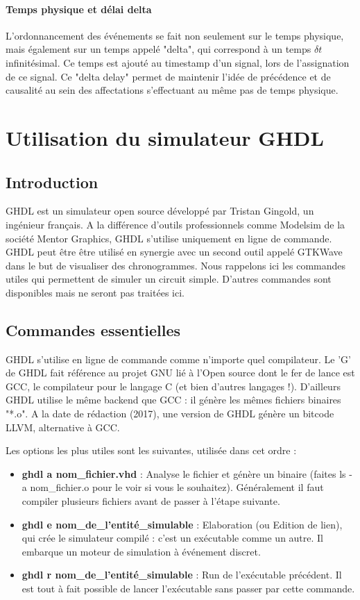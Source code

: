 \paragraph{Temps physique et délai delta}
L'ordonnancement des événements se fait non seulement sur le temps physique, mais également sur un temps appelé "delta", qui correspond
à un temps $\delta t$ infinitésimal. Ce temps est ajouté au timestamp d'un signal, lors de l'assignation de ce signal. Ce "delta delay"
permet de maintenir l'idée de précédence et de causalité au sein des affectations s'effectuant au même pas de temps physique.

\section{Utilisation du simulateur GHDL}


\subsection{Introduction}
GHDL est un simulateur open source développé par Tristan Gingold, un ingénieur français.
A la différence d'outils professionnels comme Modelsim de la société Mentor Graphics, GHDL s'utilise
uniquement en ligne de commande. GHDL peut être être utilisé en synergie avec un second outil appelé GTKWave dans le but de visualiser des chronogrammes.
Nous rappelons ici les commandes utiles qui permettent de simuler un circuit simple.
D'autres commandes sont disponibles mais ne seront pas traitées ici.

\subsection{Commandes essentielles}


GHDL s'utilise en ligne de commande comme n'importe quel compilateur.
Le 'G' de GHDL fait référence au projet GNU lié à l'Open source dont le fer de lance est GCC, le compilateur pour le langage C (et bien d'autres langages !).
D'ailleurs GHDL utilise le même backend que GCC : il génère les mêmes fichiers binaires "*.o". A la date de rédaction (2017), une version de GHDL génère un bitcode
LLVM, alternative à GCC.

Les options les plus utiles sont les suivantes, utilisée dans cet ordre :
\begin{itemize}
  \item \textbf{ghdl \-a nom\_fichier.vhd} : Analyse le fichier et génère un binaire (faites ls -a nom\_fichier.o pour le voir si vous le souhaitez). Généralement il faut compiler plusieurs fichiers avant de passer à l'étape suivante.
 \item \textbf{ghdl \-e nom\_de\_l'entité\_simulable}  : Elaboration (ou Edition de lien), qui crée le simulateur compilé : c'est un exécutable comme un autre. Il embarque un moteur de simulation à événement discret.
\item \textbf{ghdl \-r nom\_de\_l'entité\_simulable}  : Run de l'exécutable précédent. Il est tout à fait possible de lancer l'exécutable sans passer par cette commande.
\end{itemize}


